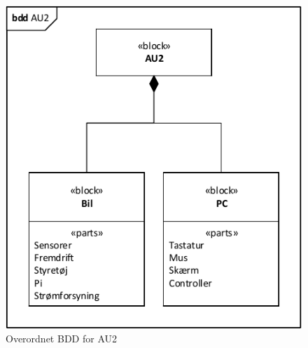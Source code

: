 \begin{figure}[h]
\centering
\includegraphics[scale=1]{../fig/diagrammer/bdd_au2.pdf}
\caption{Overordnet BDD for AU2}
\label{fig:bdd_au2}
\end{figure}

 \clearpage
 \clearpage
 \clearpage
